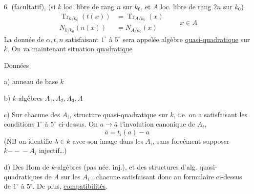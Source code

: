 \textcircled{6} (\uline{facultatif}),  (si $k$ loc. libre de rang $n$ sur $k_0$, et $A$ loc. libre de rang $2n$ sur $k_0$)
\[
 \boxed{\begin{aligned}
 \operatorname{Tr}_{k/k_0}(t(x))&=\operatorname{Tr}_{A/k_0}(x)\\
 N_{k/k_0}(n(x))&=N_{A/k_0}(x)
 \end{aligned}}\qquad x\in A
\]
La donnée de  $\alpha,t,n$ satisfaisant $1^\circ$ à $5^\circ$ sera appelée algèbre \uline{quasi-quadratique} sur $k$.
On va maintenant  situation  \uline{quadratique}

Données

a) anneau de base $k$

b) $k$-algèbres $A_1,A_2,A_3,A$

c) Sur chacune des $A_i$, structure quasi-quadratique sur $k$, i.e. on a
satisfaisant les conditions $1^\circ$ à $5^\circ$ ci-dessus. On  $a\longrightarrow\bar a$ l'involution canonique de $A_i$,
\[
 \bar a=t_i(a)-a
\]
(NB on identifie  $\lambda\in k$ avec son image dans les $A_i$, sans forcément supposer $k\mathrel{-\!\!-\!\!-}A_i$ injectif\ldots)

d) Des Hom de $k$-algèbres
(pas néc. inj.), et des structures d'alg. quasi-quadratiques de $A$ sur les $A_i$
, chacune satisfaisant donc au formulaire ci-dessus de $1^\circ$ à $5^\circ$. De plus, \uline{compatibilités}.

